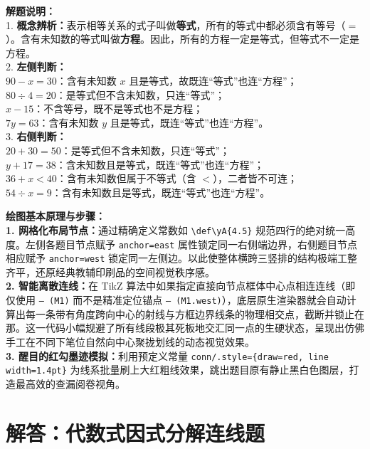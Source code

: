 \vspace{0.6cm}

{\small\color{gray}
\textbf{解题说明：}\\
1. \textbf{概念辨析：}表示相等关系的式子叫做\textbf{等式}，所有的等式中都必须含有等号（$=$）。含有未知数的等式叫做\textbf{方程}。因此，所有的方程一定是等式，但等式不一定是方程。\\
2. \textbf{左侧判断：}\\
\quad $90-x=30$：含有未知数 $x$ 且是等式，故既连“等式”也连“方程”；\\
\quad $80\div4=20$：是等式但不含未知数，只连“等式”；\\
\quad $x-15$：不含等号，既不是等式也不是方程；\\
\quad $7y=63$：含有未知数 $y$ 且是等式，既连“等式”也连“方程”。\\
3. \textbf{右侧判断：}\\
\quad $20+30=50$：是等式但不含未知数，只连“等式”；\\
\quad $y+17=38$：含未知数且是等式，既连“等式”也连“方程”；\\
\quad $36+x<40$：含有未知数但属于不等式（含 $<$），二者皆不可连；\\
\quad $54\div x=9$：含有未知数且是等式，既连“等式”也连“方程”。
}

\vspace{0.6cm}

{\small\color{blue!70!black}
\textbf{绘图基本原理与步骤：}\\
\textbf{1. 网格化布局节点：}通过精确定义常数如 \texttt{\textbackslash def\textbackslash yA\{4.5\}} 规范四行的绝对统一高度。左侧各题目节点赋予 \texttt{anchor=east} 属性锁定同一右侧端边界，右侧题目节点相应赋予 \texttt{anchor=west} 锁定同一左侧边。以此使整体横跨三竖排的结构极端工整齐平，还原经典教辅印刷品的空间视觉秩序感。\\
\textbf{2. 智能离散连线：}在 TikZ 算法中如果指定直接向节点框体中心点相连连线（即仅使用 \texttt{-- (M1)} 而不是精准定位锚点 \texttt{-- (M1.west)}），底层原生渲染器就会自动计算出每一条带有角度跨向中心的射线与方框边界线条的物理相交点，截断并锁止在那。这一代码小幅规避了所有线段极其死板地交汇同一点的生硬状态，呈现出仿佛手工在不同下笔位自然向中心聚拢划线的动态视觉效果。\\
\textbf{3. 醒目的红勾墨迹模拟：}利用预定义常量 \texttt{conn/.style=\{draw=red, line width=1.4pt\}} 为线系批量刷上大红粗线效果，跳出题目原有静止黑白色图层，打造最高效的查漏阅卷视角。
}



\section{解答：代数式因式分解连线题}

